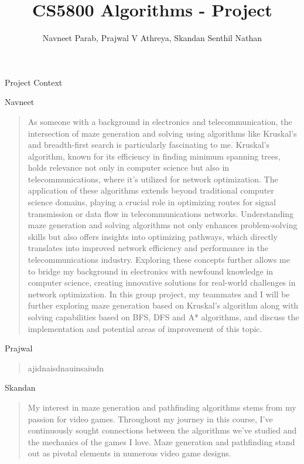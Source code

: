 \documentclass{amsart}
\author{Navneet Parab, Prajwal V Athreya, Skandan Senthil Nathan}
\title{CS5800 Algorithms - Project}
\begin{document}
\maketitle

\begin{section}{Project Context}

    \begin{subsection}{Navneet}
        \begin{quote}
            As someone with a background in electronics and telecommunication, the intersection of maze generation and solving using algorithms like Kruskal's and breadth-first search is particularly fascinating to me. Kruskal's algorithm, known for its efficiency in finding minimum spanning trees, holds relevance not only in computer science but also in telecommunications, where it's utilized for network optimization. The application of these algorithms extends beyond traditional computer science domains, playing a crucial role in optimizing routes for signal transmission or data flow in telecommunications networks. Understanding maze generation and solving algorithms not only enhances problem-solving skills but also offers insights into optimizing pathways, which directly translates into improved network efficiency and performance in the telecommunications industry. Exploring these concepts further allows me to bridge my background in electronics with newfound knowledge in computer science, creating innovative solutions for real-world challenges in network optimization. In this group project, my teammates and I will be further exploring maze generation based on Kruskal’s algorithm along with solving capabilities based on BFS, DFS and A* algorithms, and discuss the implementation and potential areas of improvement of this topic.
        \end{quote}
    \end{subsection}

    \begin{subsection}{Prajwal}
        \begin{quote}
            ajidnaisdnauinsaiudn    
        \end{quote}
    \end{subsection}

    \begin{subsection}{Skandan}
        \begin{quote}
            My interest in maze generation and pathfinding algorithms stems from my passion for video games. Throughout my journey in this course, I've continuously sought connections between the algorithms we've studied and the mechanics of the games I love. Maze generation and pathfinding stand out as pivotal elements in numerous video game designs.


\end{quote}
\end{subsection}
\end{section}
\end{document}
